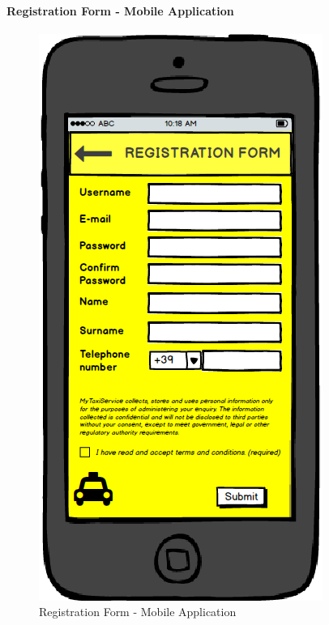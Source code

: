 \paragraph{Registration Form - Mobile Application}
\begin{figure}[!h]
	\begin{center}
		\includegraphics[scale=0.5]{../SE2_MOCKUPS/MobileAppRegistrationForm.png}
		\caption{Registration Form - Mobile Application}	
	\end{center}
\end{figure}
\newpage
